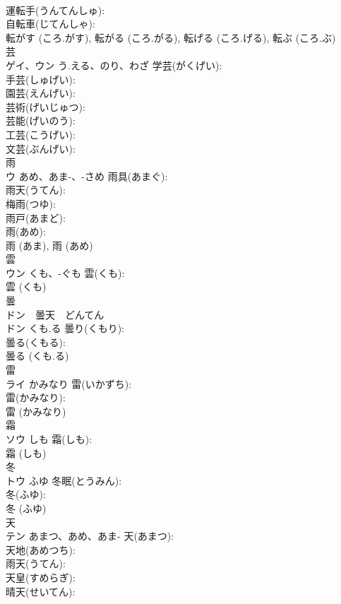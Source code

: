\documentclass[8pt]{extreport}
\begin{document}
\begin{CJK}{UTF8}{min}
\\	運転手(うんてんしゅ): 
\\	自転車(じてんしゃ): 
\\	転がす (ころ.がす), 転がる (ころ.がる), 転げる (ころ.げる), 転ぶ (ころ.ぶ)
\\	芸			
\\	ゲイ、ウン	う.える、のり、わざ	学芸(がくげい): 
\\	手芸(しゅげい): 
\\	園芸(えんげい): 
\\	芸術(げいじゅつ): 
\\	芸能(げいのう): 
\\	工芸(こうげい): 
\\	文芸(ぶんげい): 
\\	雨			
\\	ウ	あめ、あま-、-さめ	雨具(あまぐ): 
\\	雨天(うてん): 
\\	梅雨(つゆ): 
\\	雨戸(あまど): 
\\	雨(あめ): 
\\	雨 (あま), 雨 (あめ)
\\	雲			
\\	ウン	くも、-ぐも	雲(くも): 
\\	雲 (くも)
\\	曇			
\\	ドン　曇天　どんてん
\\	ドン	くも.る	曇り(くもり): 
\\	曇る(くもる): 
\\	曇る (くも.る)
\\	雷			
\\	ライ	かみなり	雷(いかずち): 
\\	雷(かみなり): 
\\	雷 (かみなり)
\\	霜			
\\	ソウ	しも	霜(しも): 
\\	霜 (しも)
\\	冬			
\\	トウ	ふゆ	冬眠(とうみん): 
\\	冬(ふゆ): 
\\	冬 (ふゆ)
\\	天			
\\	テン	あまつ、あめ、あま-	天(あまつ): 
\\	天地(あめつち): 
\\	雨天(うてん): 
\\	天皇(すめらぎ): 
\\	晴天(せいてん): 

\end{CJK}
\end{document}
